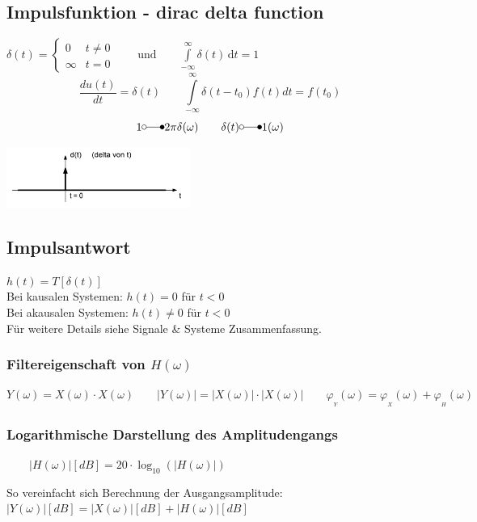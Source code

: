 \subsection{Impulsfunktion - dirac delta function}
	\begin{minipage}{10cm}
		$\delta (t)=\begin{cases} 0 & t\ne 0\\\infty & t=0\end{cases} \qquad
		\text{und} \qquad \int\limits_{-\infty}^\infty \delta(t) \, \mathrm dt = 1 $\\
		$$\frac{du(t)}{dt}=\delta(t) \qquad
		\int\limits_{-\infty}^{\infty}\delta(t-t_0)f(t)dt=f(t_0)$$
		$$ 1 \laplace 2\pi \delta(\omega) \qquad \delta(t) \laplace 1(\omega)$$
	\end{minipage}
	\begin{minipage}{8cm}
		\includegraphics[width=6cm]{bilder/diracimpulse.png}
	\end{minipage}


	\subsection{Impulsantwort}
		$h(t) = T[\delta(t)] \qquad $\\
		Bei kausalen Systemen: $h(t) = 0$ für $t < 0$ \\   
		Bei akausalen Systemen: $h(t) \neq 0$ für $t < 0$\\ 
		Für weitere Details siehe Signale \& Systeme Zusammenfassung.
		\subsubsection{Filtereigenschaft von $H(\omega)$}
			$ Y(\omega) = X(\omega) \cdot X(\omega)
				\qquad |Y(\omega)| = |X(\omega)| \cdot |X(\omega)|
				\qquad \varphi_{_Y}(\omega) = \varphi_{_X}(\omega) + \varphi_{_H}(\omega)$
		
		\subsubsection{Logarithmische Darstellung des Amplitudengangs}
			$ \qquad |H(\omega)| [dB] = 20 \cdot \log_{10}(|H(\omega)|)\qquad$
			\parbox{10cm}{So vereinfacht sich Berechnung der 
				Ausgangsamplitude:\\
				\hspace*{0.5cm}$ |Y(\omega)| [dB] = |X(\omega)|[dB] + |H(\omega)| [dB]$
			}


